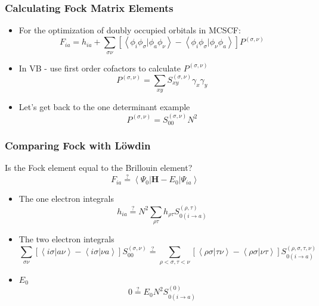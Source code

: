 \documentclass[]{beamer}
\begin{document}
\begin{frame}
  \frametitle{Calculating Fock Matrix Elements}
  \begin{itemize}
    \item {For the optimization of doubly occupied orbitals in MCSCF:}
    \begin{equation*}
    F_{ia}=h_{ia}+\sum_{\sigma\nu}\left[ \left< \phi_i\phi_\sigma|\phi_a\phi_\nu\right> - \left< \phi_i\phi_\sigma| \phi_\nu\phi_a \right> \right] P^{(\sigma,\nu)}
    \end{equation*}
    \item{In VB - use first order cofactors to calculate $P^{(\sigma,\nu)}$}
    \begin{equation*}
    P^{(\sigma,\nu)}=\sum_{xy}S^{(\sigma,\nu)}_{xy}\gamma_x\gamma_y
    \end{equation*}
    \item{Let's get back to the one determinant example}
    \begin{equation*}
    P^{(\sigma,\nu)}=S^{(\sigma,\nu)}_{00}N^2  
    \end{equation*}
  \end{itemize}
\end{frame}

\begin{frame}
  \frametitle{Comparing Fock with L\"owdin}
  {Is the Fock element equal to the Brillouin element?}
    \begin{equation*}
F_{ia} \stackrel {?}{=} \left< \Psi_0 | \mathbf{H} - E_0 | \Psi_{ia} \right>  
  \end{equation*}
  \begin{itemize}
  \item {The one electron integrals}
  \begin{equation*}
h_{ia} \stackrel {?}{=} N^2 \sum_{\rho\tau} h_{\rho\tau} S_{0(i\rightarrow a)}^{(\rho,\tau)}
\end{equation*}
  \item {The two electron integrals}
\begin{equation*}
\sum_{\sigma \nu} [ \left <i \sigma | a \nu \right > - \left < i \sigma | \nu a \right> ]S_{00}^{(\sigma,\nu)} \stackrel {?}{=}  \sum_{\rho<\sigma,\tau<\nu} [\left <\rho\sigma|\tau\nu \right > - \left < \rho\sigma | \nu\tau \right> ]  S_{0(i\rightarrow a)}^{(\rho,\sigma,\tau,\nu)}
\end{equation*}
  \item{$E_0$}
\begin{equation*}
0 \stackrel {?}{=} E_0 N^2 S_{0(i\rightarrow a)}^{(0)}
\end{equation*}
  \end{itemize}
\end{frame}
\end{document}
